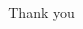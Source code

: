 \documentclass[aspectratio=169]{beamer}
\begin{document}

%



{
\begin{frame}[plain]
\begin{columns}%
        \begin{column}{.82\textwidth}
        \end{column}
	\begin{column}{0.18\textwidth}
		\begin{shaded}
			Thank you
		\end{shaded}
	\end{column}
    \end{columns}
\end{frame}}
\end{document}
